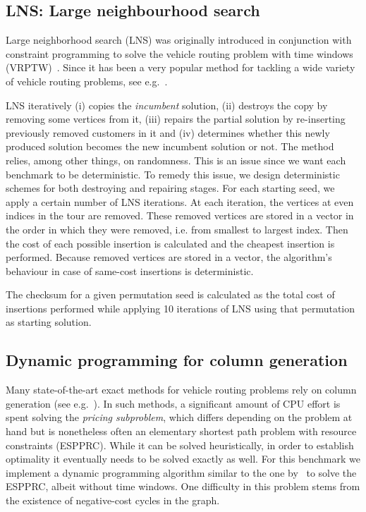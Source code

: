 \documentclass[11pt,a4paper,notitlepage]{article}
\begin{document}
\subsection{LNS: Large neighbourhood search}
Large neighborhood search (LNS) was originally introduced in
conjunction with constraint programming to solve the vehicle routing
problem with time windows (VRPTW)~\cite{lns}. Since it has been
a very popular method for tackling a wide variety of vehicle routing
problems, see e.g.~\cite{lnschapter}.

LNS iteratively (i) copies the \emph{incumbent} solution, (ii)
destroys the copy by removing some vertices from it, (iii) repairs the
partial solution by re-inserting previously removed customers in it
and (iv) determines whether this newly produced solution becomes the
new incumbent solution or not. The method relies, among other
things, on randomness. This is an issue since we want each benchmark
to be deterministic. To remedy this issue, we design deterministic
schemes for both destroying and repairing stages. For each starting
seed, we apply a certain number of LNS iterations. At each iteration,
the vertices at even indices in the tour are removed. These removed
vertices are stored in a vector in the order in which they were
removed, i.e. from smallest to largest index. Then the cost of each
possible insertion is calculated and the cheapest insertion is
performed. Because removed vertices are stored in a vector, the
algorithm's behaviour in case of same-cost insertions is
deterministic. 

The checksum for a given permutation seed is calculated as the total
cost of insertions performed while applying 10 iterations of LNS using
that permutation as starting solution.

\subsection{Dynamic programming for column generation}
\label{sec:espprc}
Many state-of-the-art exact methods for vehicle routing problems rely
on column generation (see e.g.~\cite{Baldacci:2012survey}). In such
methods, a significant amount of CPU effort is spent solving the
\emph{pricing subproblem}, which differs depending on the problem at
hand but is nonetheless often an elementary shortest path problem with
resource constraints (ESPPRC). While it can be solved heuristically,
in order to establish optimality it eventually needs to be solved
exactly as well. For this benchmark we implement a dynamic
programming algorithm similar to the one by~\cite{feillet:2004exact}
to solve the ESPPRC, albeit without time windows. One difficulty in
this problem stems from the existence of negative-cost cycles in the
graph. 
\end{document}
